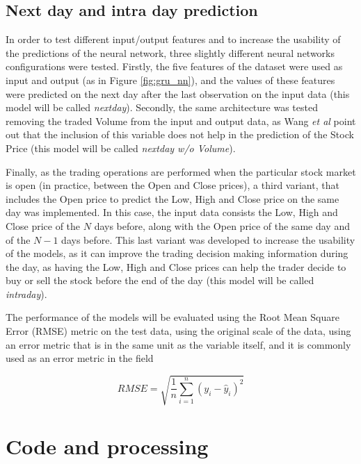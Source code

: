\documentclass[10pt,twocolumn,letterpaper]{article}
\begin{document}
\subsection{Next day and intra day prediction}

In order to test different input/output features and to increase the usability of the predictions of the neural network, three slightly different neural networks configurations were tested. Firstly, the five features of the dataset were used as input and output (as in Figure \ref{fig:gru_nn}), and the values of these features were predicted on the next day after the last observation on the input data (this model will be called \textit{nextday}). Secondly, the same architecture was tested removing the traded Volume from the input and output data, as Wang \textit{et al} \cite{Wang2003} point out that the inclusion of this variable does not help in the prediction of the Stock Price (this model will be called \textit{nextday w/o Volume}). 

Finally, as the trading operations are performed when the particular stock market is open (in practice, between the Open and Close prices), a third variant, that includes the Open price to predict the Low, High and Close price on the same day was implemented. In this case, the input data consists the Low, High and Close price of the $N$ days before, along with the Open price of the same day and of the $N-1$ days before. This last variant was developed to increase the usability of the models, as it can improve the trading decision making information during the day, as having the Low, High and Close prices can help the trader decide to buy or sell the stock before the end of the day (this model will be called \textit{intraday}).

The performance of the models will be evaluated using the Root Mean Square Error (RMSE) metric on the test data, using the original scale of the data, using an error metric that is in the same unit as the variable itself, and it is commonly used as an error metric in the field \cite{Qiu2020,Sethia2019}

\begin{equation}
	RMSE = \sqrt{\frac{1}{n}\sum_{i=1}^{n} (y_i - \hat{y}_i)^2}
\end{equation}
 
\section{Code and processing}
\end{document}
